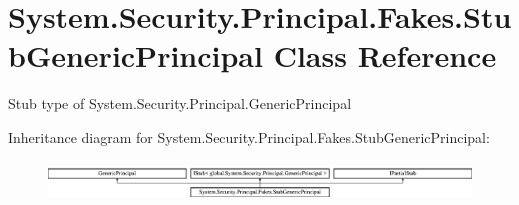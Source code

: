 \hypertarget{class_system_1_1_security_1_1_principal_1_1_fakes_1_1_stub_generic_principal}{\section{System.\-Security.\-Principal.\-Fakes.\-Stub\-Generic\-Principal Class Reference}
\label{class_system_1_1_security_1_1_principal_1_1_fakes_1_1_stub_generic_principal}
}


Stub type of System.\-Security.\-Principal.\-Generic\-Principal 


Inheritance diagram for System.\-Security.\-Principal.\-Fakes.\-Stub\-Generic\-Principal\-:\begin{figure}[H]
\begin{center}
\leavevmode
\includegraphics[height=1.054614cm]{class_system_1_1_security_1_1_principal_1_1_fakes_1_1_stub_generic_principal}
\end{center}
\end{figure}
